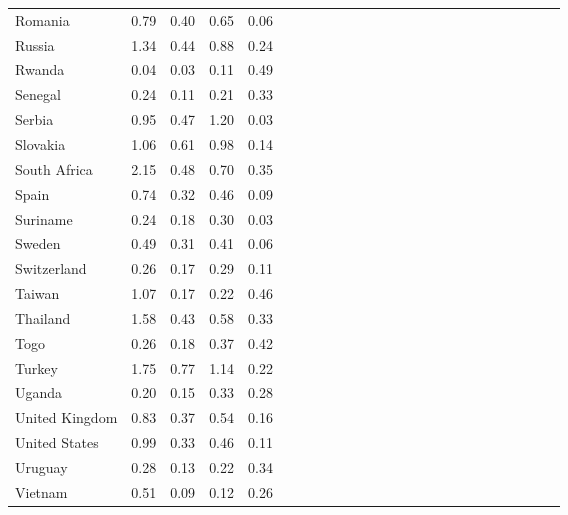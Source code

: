 \begin{ThreePartTable}
\begin{longtable}[t]{l|r|rrrl|r|rrrl|r|rrrl|r|rrrl|r|rrr}
Romania & 0.79 & 0.40 & 0.65 & 0.06\\
Russia & 1.34 & 0.44 & 0.88 & 0.24\\
Rwanda & 0.04 & 0.03 & 0.11 & 0.49\\
Senegal & 0.24 & 0.11 & 0.21 & 0.33\\
Serbia & 0.95 & 0.47 & 1.20 & 0.03\\
Slovakia & 1.06 & 0.61 & 0.98 & 0.14\\
South Africa & 2.15 & 0.48 & 0.70 & 0.35\\
Spain & 0.74 & 0.32 & 0.46 & 0.09\\
Suriname & 0.24 & 0.18 & 0.30 & 0.03\\
Sweden & 0.49 & 0.31 & 0.41 & 0.06\\
Switzerland & 0.26 & 0.17 & 0.29 & 0.11\\
Taiwan & 1.07 & 0.17 & 0.22 & 0.46\\
Thailand & 1.58 & 0.43 & 0.58 & 0.33\\
Togo & 0.26 & 0.18 & 0.37 & 0.42\\
Turkey & 1.75 & 0.77 & 1.14 & 0.22\\
Uganda & 0.20 & 0.15 & 0.33 & 0.28\\
United Kingdom & 0.83 & 0.37 & 0.54 & 0.16\\
United States & 0.99 & 0.33 & 0.46 & 0.11\\
Uruguay & 0.28 & 0.13 & 0.22 & 0.34\\
Vietnam & 0.51 & 0.09 & 0.12 & 0.26\\*
\end{longtable}
\end{ThreePartTable}
\endgroup{}
